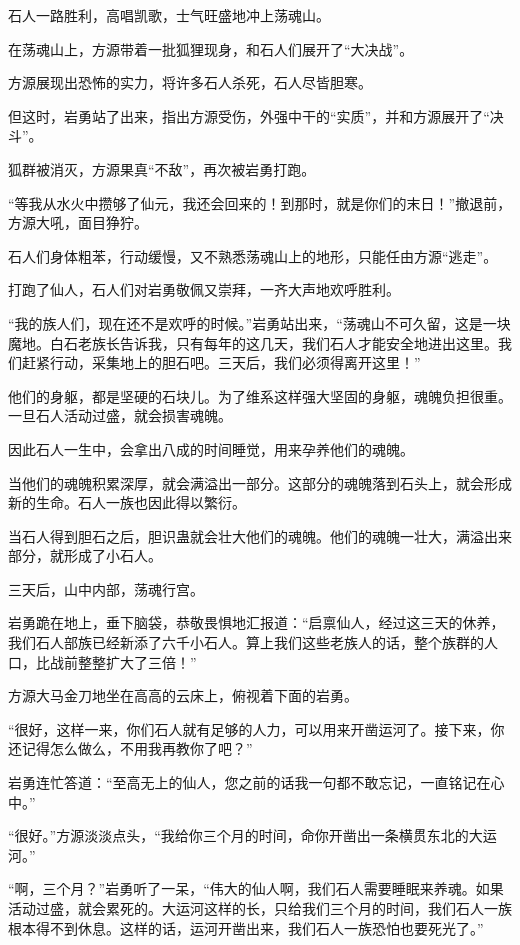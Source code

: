 \begin{this_body}
石人一路胜利，高唱凯歌，士气旺盛地冲上荡魂山。

在荡魂山上，方源带着一批狐狸现身，和石人们展开了“大决战”。

方源展现出恐怖的实力，将许多石人杀死，石人尽皆胆寒。

但这时，岩勇站了出来，指出方源受伤，外强中干的“实质”，并和方源展开了“决斗”。

狐群被消灭，方源果真“不敌”，再次被岩勇打跑。

“等我从水火中攒够了仙元，我还会回来的！到那时，就是你们的末日！”撤退前，方源大吼，面目狰狞。

石人们身体粗苯，行动缓慢，又不熟悉荡魂山上的地形，只能任由方源“逃走”。

打跑了仙人，石人们对岩勇敬佩又崇拜，一齐大声地欢呼胜利。

“我的族人们，现在还不是欢呼的时候。”岩勇站出来，“荡魂山不可久留，这是一块魔地。白石老族长告诉我，只有每年的这几天，我们石人才能安全地进出这里。我们赶紧行动，采集地上的胆石吧。三天后，我们必须得离开这里！”

他们的身躯，都是坚硬的石块儿。为了维系这样强大坚固的身躯，魂魄负担很重。一旦石人活动过盛，就会损害魂魄。

因此石人一生中，会拿出八成的时间睡觉，用来孕养他们的魂魄。

当他们的魂魄积累深厚，就会满溢出一部分。这部分的魂魄落到石头上，就会形成新的生命。石人一族也因此得以繁衍。

当石人得到胆石之后，胆识蛊就会壮大他们的魂魄。他们的魂魄一壮大，满溢出来部分，就形成了小石人。

三天后，山中内部，荡魂行宫。

岩勇跪在地上，垂下脑袋，恭敬畏惧地汇报道：“启禀仙人，经过这三天的休养，我们石人部族已经新添了六千小石人。算上我们这些老族人的话，整个族群的人口，比战前整整扩大了三倍！”

方源大马金刀地坐在高高的云床上，俯视着下面的岩勇。

“很好，这样一来，你们石人就有足够的人力，可以用来开凿运河了。接下来，你还记得怎么做么，不用我再教你了吧？”

岩勇连忙答道：“至高无上的仙人，您之前的话我一句都不敢忘记，一直铭记在心中。”

“很好。”方源淡淡点头，“我给你三个月的时间，命你开凿出一条横贯东北的大运河。”

“啊，三个月？”岩勇听了一呆，“伟大的仙人啊，我们石人需要睡眠来养魂。如果活动过盛，就会累死的。大运河这样的长，只给我们三个月的时间，我们石人一族根本得不到休息。这样的话，运河开凿出来，我们石人一族恐怕也要死光了。”


\end{this_body}
